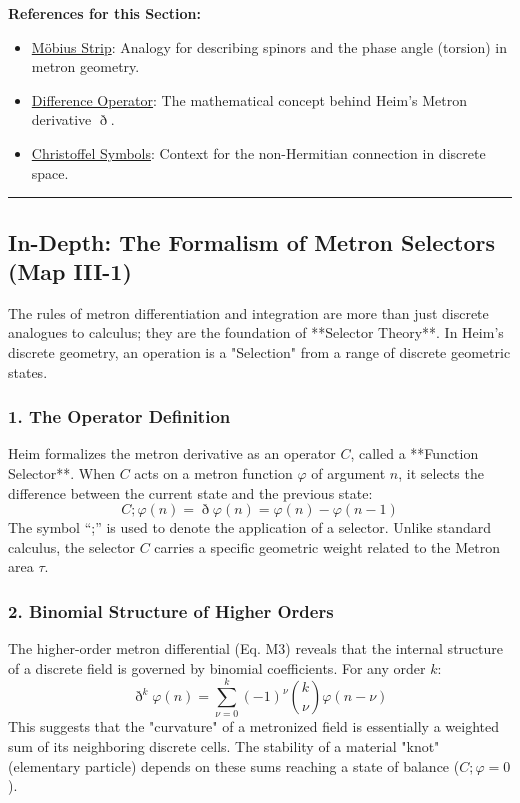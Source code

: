 \documentclass[11pt,a4paper,oneside]{article}
\newenvironment{sectionrefs}
  {\par\vspace{1em}\noindent\textbf{\textsf{References for this Section:}}\begin{itemize}[leftmargin=*, label={\scriptsize$\blacksquare$}, itemsep=2pt]}
  {\end{itemize}}
\newcommand{\hr}{\par\vspace{2em}\noindent\rule{\linewidth}{0.4pt}\par\vspace{2em}}
\begin{document}
\begin{sectionrefs}
    \item \href{https://en.wikipedia.org/wiki/M%C3%B6bius_strip}{Möbius Strip}: Analogy for describing spinors and the phase angle (torsion) in metron geometry.
    \item \href{https://en.wikipedia.org/wiki/Difference_operator}{Difference Operator}: The mathematical concept behind Heim's Metron derivative $\eth$.
    \item \href{https://en.wikipedia.org/wiki/Christoffel_symbols}{Christoffel Symbols}: Context for the non-Hermitian connection in discrete space.
\end{sectionrefs}

\hr

\subsection*{In-Depth: The Formalism of Metron Selectors (Map III-1)}

The rules of metron differentiation and integration are more than just discrete analogues to calculus; they are the foundation of **Selector Theory**. In Heim's discrete geometry, an operation is a "Selection" from a range of discrete geometric states.

\subsubsection*{1. The Operator Definition}
Heim formalizes the metron derivative as an operator $C$, called a **Function Selector**. When $C$ acts on a metron function $\varphi$ of argument $n$, it selects the difference between the current state and the previous state:
\begin{equation}
    C; \varphi(n) = \eth \varphi(n) = \varphi(n) - \varphi(n-1)
\end{equation}
The symbol ``;'' is used to denote the application of a selector. Unlike standard calculus, the selector $C$ carries a specific geometric weight related to the Metron area $\tau$.

\subsubsection*{2. Binomial Structure of Higher Orders}
The higher-order metron differential (Eq. M3) reveals that the internal structure of a discrete field is governed by binomial coefficients. For any order $k$:
\begin{equation}
    \eth^k \varphi(n) = \sum_{\nu=0}^{k} (-1)^\nu \binom{k}{\nu} \varphi(n-\nu)
\end{equation}
This suggests that the "curvature" of a metronized field is essentially a weighted sum of its neighboring discrete cells. The stability of a material "knot" (elementary particle) depends on these sums reaching a state of balance ($C; \varphi = 0$).
\end{document}
